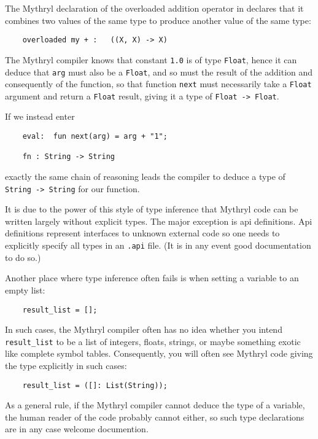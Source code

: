 The Mythryl declaration of the overloaded addition operator in 
declares that it combines two values of the same type to produce another 
value of the same type:

\begin{verbatim}
    overloaded my + :   ((X, X) -> X)
\end{verbatim}

The Mythryl compiler knows that constant {\tt 1.0} is of type {\tt Float}, 
hence it can deduce that {\tt arg} must also be a {\tt Float}, and so 
must the result of the addition and consequently of the function, so 
that function {\tt next} must necessarily take a {\tt Float} argument 
and return a {\tt Float} result, giving it a type of {\tt Float -> Float}. 

If we instead enter

\begin{verbatim}
    eval:  fun next(arg) = arg + "1";

    fn : String -> String
\end{verbatim}

exactly the same chain of reasoning leads the compiler to deduce a type 
of {\tt String -> String} for our function.

It is due to the power of this style of type inference that Mythryl code can 
be written largely without explicit types.  The major exception is api 
definitions.  Api definitions represent interfaces to unknown external code 
so one needs to explicitly specify all types in an {\tt .api} file. 
(It is in any event good documentation to do so.) 

Another place where type inference often fails is when setting a variable to 
an empty list:

\begin{verbatim}
    result_list = [];
\end{verbatim}

In such cases, the Mythryl compiler often has no idea whether you intend {\tt result\_list} 
to be a list of integers, floats, strings, or maybe something exotic like complete 
symbol tables.  Consequently, you will often see Mythryl code giving the type 
explicitly in such cases:

\begin{verbatim}
    result_list = ([]: List(String));
\end{verbatim}

As a general rule, if the Mythryl compiler cannot deduce the type of a variable, 
the human reader of the code probably cannot either, so such type declarations 
are in any case welcome documention.

